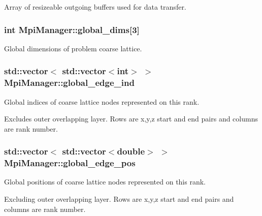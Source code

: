 Array of resizeable outgoing buffers used for data transfer. 

\subsubsection[{\texorpdfstring{global\+\_\+dims}{global_dims}}]{\setlength{\rightskip}{0pt plus 5cm}int Mpi\+Manager\+::global\+\_\+dims\mbox{[}3\mbox{]}}\hypertarget{class_mpi_manager_ae41fb382e17680a49821077167bf1905}{}\label{class_mpi_manager_ae41fb382e17680a49821077167bf1905}


Global dimensions of problem coarse lattice. 

\subsubsection[{\texorpdfstring{global\+\_\+edge\+\_\+ind}{global_edge_ind}}]{\setlength{\rightskip}{0pt plus 5cm}std\+::vector$<$ std\+::vector$<$int$>$ $>$ Mpi\+Manager\+::global\+\_\+edge\+\_\+ind}\hypertarget{class_mpi_manager_a0f994471f9c2986b2c8606b7b716566a}{}\label{class_mpi_manager_a0f994471f9c2986b2c8606b7b716566a}


Global indices of coarse lattice nodes represented on this rank. 

Excludes outer overlapping layer. Rows are x,y,z start and end pairs and columns are rank number. 
\subsubsection[{\texorpdfstring{global\+\_\+edge\+\_\+pos}{global_edge_pos}}]{\setlength{\rightskip}{0pt plus 5cm}std\+::vector$<$ std\+::vector$<$double$>$ $>$ Mpi\+Manager\+::global\+\_\+edge\+\_\+pos}\hypertarget{class_mpi_manager_abd8c87e0a21d31b59d7cc1f7f146d5f4}{}\label{class_mpi_manager_abd8c87e0a21d31b59d7cc1f7f146d5f4}


Global positions of coarse lattice nodes represented on this rank. 

Excluding outer overlapping layer. Rows are x,y,z start and end pairs and columns are rank number. 
